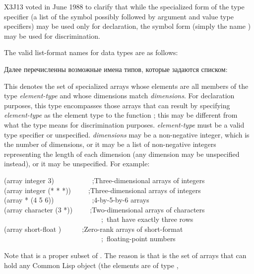 \begin{new}
X3J13 voted in June 1988  to clarify that
while the specialized form of the  type specifier
(a list of the symbol  possibly followed by
argument and value type specifiers)
may be used only for declaration, the symbol form (simply the name
) may be used for discrimination.
\end{new}

The valid list-format names for data types are as follows:

Далее перечисленны возможные имена типов, которые задаются списком:

\begin{flushdesc}
\item[\cd{(array \textit{element-type} \textit{dimensions})}]
This denotes the set
of specialized arrays
whose elements are all members of the type \textit{element-type}
and whose dimensions match \textit{dimensions}.
For declaration purposes, this type encompasses those arrays
that can result by specifying \textit{element-type} as the element type
to the function ; this may be different
from what the type means for discrimination purposes.
\textit{element-type} must be a valid type specifier or unspecified.
\textit{dimensions} may be a non-negative integer, which is the number
of dimensions, or it may be a list of non-negative integers
representing the length of each dimension (any dimension
may be unspecified instead), or it may be unspecified.
For example:
\begin{lisp}
(array integer 3)~~~~~~~~~~~;\textrm{Three-dimensional arrays of integers} \\
(array integer (* * *))~~~~~;\textrm{Three-dimensional arrays of integers} \\
(array * (4 5 6))~~~~~~~~~~~;\textrm{4-by-5-by-6 arrays} \\
(array character (3 *))~~~~~;\textrm{Two-dimensional arrays of characters} \\
~~~~~~~~~~~~~~~~~~~~~~~~~~~~;~\textrm{that have exactly three rows} \\
(array short-float {\emptylist})~~~~~~;\textrm{Zero-rank arrays of short-format} \\
~~~~~~~~~~~~~~~~~~~~~~~~~~~~;~\textrm{floating-point numbers}
\end{lisp}
Note that  is a proper subset of .
The reason is that  is the set of arrays that can
hold any Common Lisp object (the elements are of type ,

\end{flushdesc}
